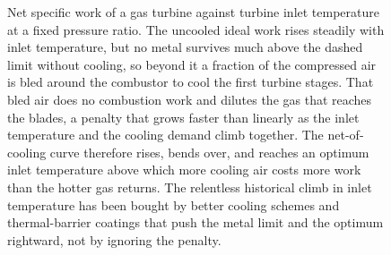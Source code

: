 \begin{figure}[htbp]
\caption[Turbine-blade cooling penalty]{Net specific work of a gas turbine
against turbine inlet temperature at a fixed pressure ratio. The uncooled ideal
work rises steadily with inlet temperature, but no metal survives much above the
dashed limit without cooling, so beyond it a fraction of the compressed air is
bled around the combustor to cool the first turbine stages. That bled air does no
combustion work and dilutes the gas that reaches the blades, a penalty that grows
faster than linearly as the inlet temperature and the cooling demand climb
together. The net-of-cooling curve therefore rises, bends over, and reaches an
optimum inlet temperature above which more cooling air costs more work than the
hotter gas returns. The relentless historical climb in inlet temperature has been
bought by better cooling schemes and thermal-barrier coatings that push the metal
limit and the optimum rightward, not by ignoring the penalty.}
\label{fig:vol04ch03:blade-cooling-penalty}
\end{figure}
